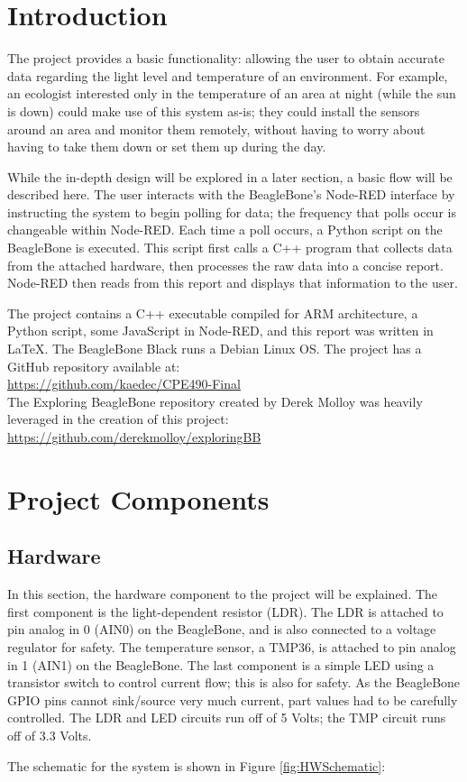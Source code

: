 \documentclass[12pt]{article}
\begin{document}
\newpage
\section{Introduction} \label{sec:intro}
The project provides a basic functionality: allowing the user to obtain accurate data regarding the light level and temperature of an environment.  For example, an ecologist interested only in the temperature of an area at night (while the sun is down) could make use of this system as-is; they could install the sensors around an area and monitor them remotely, without having to worry about having to take them down or set them up during the day.\par
While the in-depth design will be explored in a later section, a basic flow will be described here.  The user interacts with the BeagleBone's Node-RED interface by instructing the system to begin polling for data; the frequency that polls occur is changeable within Node-RED.  Each time a poll occurs, a Python script on the BeagleBone is executed.  This script first calls a C++ program that collects data from the attached hardware, then processes the raw data into a concise report.  Node-RED then reads from this report and displays that information to the user.\par
The project contains a C++ executable compiled for ARM architecture, a Python script, some JavaScript in Node-RED, and this report was written in \LaTeX .  The BeagleBone Black runs a Debian Linux OS.  The project has a GitHub repository available at:\\
\vspace{14.5pt}
\indent \url{https://github.com/kaedec/CPE490-Final}\\
\indent The Exploring BeagleBone repository created by Derek Molloy \cite{eBB} was heavily leveraged in the creation of this project:\\
\vspace{14.5pt}
\indent \url{https://github.com/derekmolloy/exploringBB}

\newpage

\section{Project Components} \label{projectcomponents}
\subsection{Hardware} \label{secDP:HW}
In this section, the hardware component to the project will be explained.  The first component is the light-dependent resistor (LDR).  The LDR is attached to pin analog in 0 (AIN0) on the BeagleBone, and is also connected to a voltage regulator for safety.  The temperature sensor, a TMP36, is attached to pin analog in 1 (AIN1) on the BeagleBone.  The last component is a simple LED using a transistor switch to control current flow; this is also for safety.  As the BeagleBone GPIO pins cannot sink/source very much current, part values had to be carefully controlled.  The LDR and LED circuits run off of 5 Volts; the TMP circuit runs off of 3.3 Volts.\par
The schematic for the system is shown in Figure \ref{fig:HWSchematic}:
\end{document}

